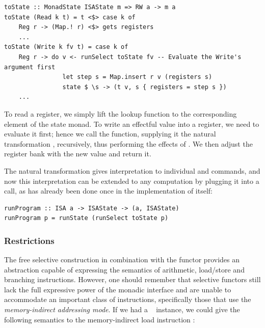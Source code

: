\vspace{1mm}
\begin{verbatim}
toState :: MonadState ISAState m => RW a -> m a
toState (Read k t) = t <$> case k of
    Reg r -> (Map.! r) <$> gets registers
    ...
toState (Write k fv t) = case k of
    Reg r -> do v <- runSelect toState fv -- Evaluate the Write's argument first
                let step s = Map.insert r v (registers s)
                state $ \s -> (t v, s { registers = step s })
    ...
\end{verbatim}
\vspace{1mm}

\noindent
To read a register, we simply lift the lookup function  to the
corresponding element of the state monad. To write an effectful value 
into a register, we need to evaluate it first; hence we call the 
function, supplying it the natural transformation , recursively,
thus performing the effects of . We then adjust the register bank with
the new value and return it.

The natural transformation  gives interpretation to individual
 and  commands, and now this interpretation can be extended
to any  computation by plugging it into a  call, as has
already been done once in the implementation of  itself:

\vspace{1mm}
\begin{verbatim}
runProgram :: ISA a -> ISAState -> (a, ISAState)
runProgram p = runState (runSelect toState p)
\end{verbatim}

\subsubsection{Restrictions}

The free selective construction in combination with the functor  provides
an abstraction capable of expressing the semantics of arithmetic, load/store and
branching instructions. However, one should remember that selective functors
still lack the full expressive power of the monadic interface and are unable to
accommodate an important class of instructions, specifically those that use the
\emph{memory-indirect addressing mode}. If we had a ~
instance, we could give the following semantics to the memory-indirect load
instruction :

